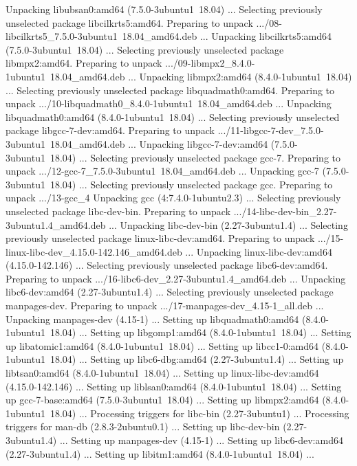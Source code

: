 Unpacking libubsan0:amd64 (7.5.0-3ubuntu1~18.04) ...
Selecting previously unselected package libcilkrts5:amd64.
Preparing to unpack .../08-libcilkrts5_7.5.0-3ubuntu1~18.04_amd64.deb ...
Unpacking libcilkrts5:amd64 (7.5.0-3ubuntu1~18.04) ...
Selecting previously unselected package libmpx2:amd64.
Preparing to unpack .../09-libmpx2_8.4.0-1ubuntu1~18.04_amd64.deb ...
Unpacking libmpx2:amd64 (8.4.0-1ubuntu1~18.04) ...
Selecting previously unselected package libquadmath0:amd64.
Preparing to unpack .../10-libquadmath0_8.4.0-1ubuntu1~18.04_amd64.deb ...
Unpacking libquadmath0:amd64 (8.4.0-1ubuntu1~18.04) ...
Selecting previously unselected package libgcc-7-dev:amd64.
Preparing to unpack .../11-libgcc-7-dev_7.5.0-3ubuntu1~18.04_amd64.deb ...
Unpacking libgcc-7-dev:amd64 (7.5.0-3ubuntu1~18.04) ...
Selecting previously unselected package gcc-7.
Preparing to unpack .../12-gcc-7_7.5.0-3ubuntu1~18.04_amd64.deb ...
Unpacking gcc-7 (7.5.0-3ubuntu1~18.04) ...
Selecting previously unselected package gcc.
Preparing to unpack .../13-gcc_4%
Unpacking gcc (4:7.4.0-1ubuntu2.3) ...
Selecting previously unselected package libc-dev-bin.
Preparing to unpack .../14-libc-dev-bin_2.27-3ubuntu1.4_amd64.deb ...
Unpacking libc-dev-bin (2.27-3ubuntu1.4) ...
Selecting previously unselected package linux-libc-dev:amd64.
Preparing to unpack .../15-linux-libc-dev_4.15.0-142.146_amd64.deb ...
Unpacking linux-libc-dev:amd64 (4.15.0-142.146) ...
Selecting previously unselected package libc6-dev:amd64.
Preparing to unpack .../16-libc6-dev_2.27-3ubuntu1.4_amd64.deb ...
Unpacking libc6-dev:amd64 (2.27-3ubuntu1.4) ...
Selecting previously unselected package manpages-dev.
Preparing to unpack .../17-manpages-dev_4.15-1_all.deb ...
Unpacking manpages-dev (4.15-1) ...
Setting up libquadmath0:amd64 (8.4.0-1ubuntu1~18.04) ...
Setting up libgomp1:amd64 (8.4.0-1ubuntu1~18.04) ...
Setting up libatomic1:amd64 (8.4.0-1ubuntu1~18.04) ...
Setting up libcc1-0:amd64 (8.4.0-1ubuntu1~18.04) ...
Setting up libc6-dbg:amd64 (2.27-3ubuntu1.4) ...
Setting up libtsan0:amd64 (8.4.0-1ubuntu1~18.04) ...
Setting up linux-libc-dev:amd64 (4.15.0-142.146) ...
Setting up liblsan0:amd64 (8.4.0-1ubuntu1~18.04) ...
Setting up gcc-7-base:amd64 (7.5.0-3ubuntu1~18.04) ...
Setting up libmpx2:amd64 (8.4.0-1ubuntu1~18.04) ...
Processing triggers for libc-bin (2.27-3ubuntu1) ...
Processing triggers for man-db (2.8.3-2ubuntu0.1) ...
Setting up libc-dev-bin (2.27-3ubuntu1.4) ...
Setting up manpages-dev (4.15-1) ...
Setting up libc6-dev:amd64 (2.27-3ubuntu1.4) ...
Setting up libitm1:amd64 (8.4.0-1ubuntu1~18.04) ...
